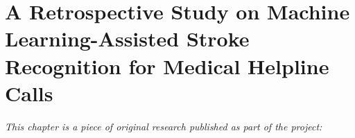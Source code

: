 
\chapter[a retrospective study on machine learning-assisted stroke recognition for medical helpline calls]{A Retrospective Study on Machine Learning-Assisted Stroke Recognition for Medical Helpline Calls}
\label{chp:paper-retrospective}

\textit{This chapter is a piece of original research published as part of the project:} \newline
\begin{center}
    \begin{enumerate}[leftmargin=8mm,rightmargin=8mm,topsep=0mm,label={[\Alph*]}]
        \setcounter{enumi}{5}
        \item {} \shared \. \parencite{wenstrup_retrospective_2023}
    \end{enumerate}
\end{center}

